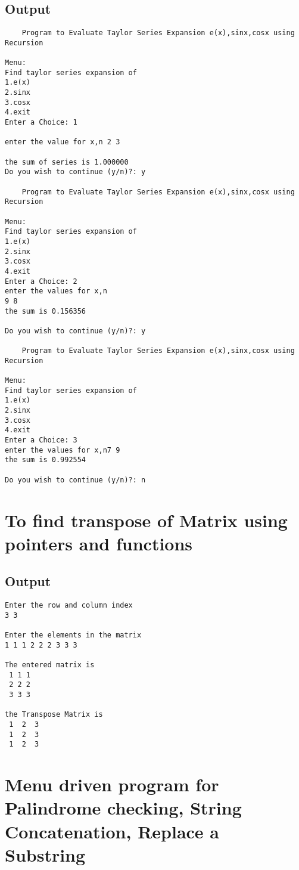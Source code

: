 \documentclass[pdftex,12pt,a4paper]{report}
\begin{document}
\subsection*{Output}
\begin{lstlisting}
	Program to Evaluate Taylor Series Expansion e(x),sinx,cosx using Recursion

Menu:
Find taylor series expansion of
1.e(x)
2.sinx
3.cosx
4.exit
Enter a Choice: 1

enter the value for x,n 2 3

the sum of series is 1.000000
Do you wish to continue (y/n)?: y

	Program to Evaluate Taylor Series Expansion e(x),sinx,cosx using Recursion

Menu:
Find taylor series expansion of
1.e(x)
2.sinx
3.cosx
4.exit
Enter a Choice: 2
enter the values for x,n
9 8
the sum is 0.156356

Do you wish to continue (y/n)?: y

	Program to Evaluate Taylor Series Expansion e(x),sinx,cosx using Recursion

Menu:
Find taylor series expansion of
1.e(x)
2.sinx
3.cosx
4.exit
Enter a Choice: 3
enter the values for x,n7 9
the sum is 0.992554

Do you wish to continue (y/n)?: n

\end{lstlisting}

\newpage
\section*{To find transpose of Matrix using pointers and functions}

\subsection*{Output}
\begin{lstlisting}
Enter the row and column index
3 3

Enter the elements in the matrix
1 1 1 2 2 2 3 3 3

The entered matrix is
 1 1 1
 2 2 2
 3 3 3

the Transpose Matrix is
 1  2  3 
 1  2  3 
 1  2  3 

\end{lstlisting}


\newpage
\section*{Menu driven program for Palindrome checking, String Concatenation, Replace a Substring}

\end{document}
